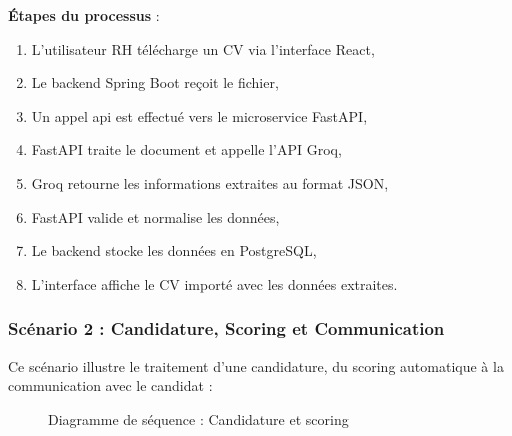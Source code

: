 \textbf{Étapes du processus} :

\begin{enumerate}
    \item L'utilisateur RH télécharge un CV via l'interface React,
    \item Le backend Spring Boot reçoit le fichier,
    \item Un appel \acrfull{api} est effectué vers le microservice FastAPI,
    \item FastAPI traite le document et appelle l'API Groq,
    \item Groq retourne les informations extraites au format JSON,
    \item FastAPI valide et normalise les données,
    \item Le backend stocke les données en PostgreSQL,
    \item L'interface affiche le CV importé avec les données extraites.
\end{enumerate}


\subsubsection{Scénario 2 : Candidature, Scoring et Communication}
\label{subsubsec:scenario2-candidature-scoring}

Ce scénario illustre le traitement d'une candidature, du scoring automatique à la communication avec le candidat :

\begin{figure}[!ht]
    \centering
    \caption{Diagramme de séquence : Candidature et scoring}
    \label{fig:sequence-candidature}
\end{figure}

